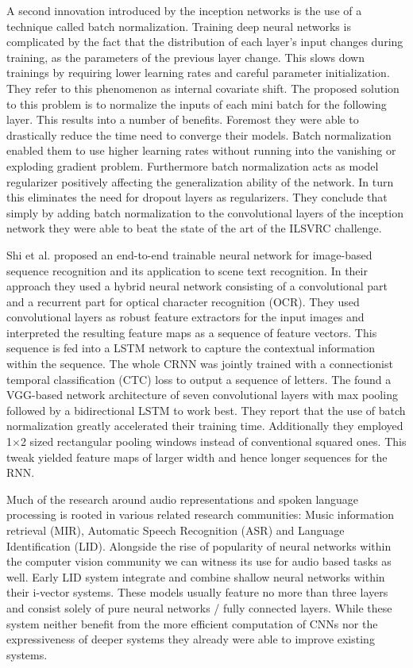 A second innovation introduced by the inception networks is the use of a technique called batch normalization\cite{ioffe2015batch}. Training deep neural networks is complicated by the fact that the distribution of each layer's input changes during training, as the parameters of the previous layer change. This slows down trainings by requiring lower learning rates and careful parameter initialization. They refer to this phenomenon as internal covariate shift. The proposed solution to this problem is to normalize the inputs of each mini batch for the following layer. This results into a number of benefits. Foremost they were able to drastically reduce the time need to converge their models. Batch normalization enabled them to use higher learning rates without running into the vanishing or exploding gradient problem. Furthermore batch normalization acts as model regularizer positively affecting the generalization ability of the network. In turn this eliminates the need for dropout layers as regularizers. They conclude that simply by adding batch normalization to the convolutional layers of the inception network they were able to beat the state of the art of the ILSVRC challenge.

Shi et al.\cite{shi2016end} proposed an end-to-end trainable neural network for image-based sequence recognition and its application to scene text recognition. In their approach they used a hybrid neural network consisting of a convolutional part and a recurrent part for optical character recognition (OCR). They used convolutional layers as robust feature extractors for the input images and interpreted the resulting feature maps as a sequence of feature vectors. This sequence is fed into a LSTM network to capture the contextual information within the sequence. The whole CRNN was jointly trained with a connectionist temporal classification (CTC) loss \cite{graves2006connectionist} to output a sequence of letters. The found a VGG-based network architecture of seven convolutional layers with max pooling followed by a bidirectional LSTM to work best. They report that the use of batch normalization greatly accelerated their training time. Additionally they employed 1$\times$2 sized rectangular pooling windows instead of conventional squared ones. This tweak yielded feature maps of larger width and hence longer sequences for the RNN.


Much of the research around audio representations and spoken language processing is rooted in various related research communities: Music information retrieval (MIR), Automatic Speech Recognition (ASR) and Language Identification (LID). Alongside the rise of popularity of neural networks within the computer vision community we can witness its use for audio based tasks as well. Early LID system integrate and combine shallow neural networks within their i-vector systems\cite{gonzalez2014automatic, han2013trap, matejka2014neural, richardson2015unified}. These models usually feature no more than three layers and consist solely of pure neural networks / fully connected layers. While these system neither benefit from the more efficient computation of CNNs nor the expressiveness of deeper systems they already were able to improve existing systems.


